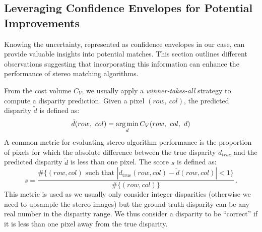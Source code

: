 \subsection{Leveraging Confidence Envelopes for Potential Improvements}\label{sec:sad_improvements}

Knowing the uncertainty, represented as confidence envelopes in our case, can provide valuable insights into potential matches. This section outlines different observations suggesting that incorporating this information can enhance the performance of stereo matching algorithms.

From the cost volume $C_V$, we usually apply a \textit{winner-takes-all} strategy to compute a disparity prediction. Given a pixel $(row, ~col)$, the predicted disparity $\tilde{d}$ is defined as:
\begin{align}\label{eq:winner_takes_all}
    \tilde{d}(row, ~col) = \operatorname*{arg\,min}_{d}C_V(row, ~col, ~d)
\end{align}
A common metric for evaluating stereo algorithm performance is the proportion of pixels for which the absolute difference between the true disparity $d_{true}$ and the predicted disparity $\tilde{d}$ is less than one pixel. The score \( s \) is defined as:
\begin{equation}\label{eq:score_d1}
    s = \frac{\#\{(row, col) \text{ such that } |d_{\mathrm{true}}(row, col) - \tilde{d}(row, col)| < 1\}}{\#\{(row, col)\}}\,.
\end{equation}
This metric is used as we usually only consider integer disparities (otherwise we need to upsample the stereo images) but the ground truth disparity can be any real number in the disparity range. We thus consider a disparity to be ``correct'' if it is less than one pixel away from the true disparity.

